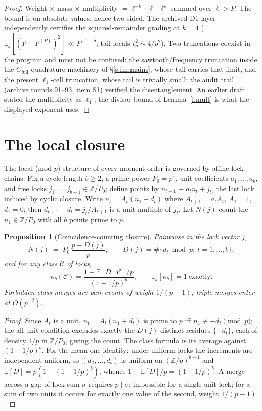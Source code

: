 \documentclass[11pt]{article}
\numberwithin{equation}{section}
\newtheorem{proposition}[theorem]{Proposition}
\theoremstyle{definition}
\theoremstyle{remark}
\begin{document}
\begin{proof}
Weight $\times$ mass $\times$ multiplicity
$=\ell^{-k}\cdot\ell\cdot\ell^{\varepsilon}$ summed over
$\ell>P$. The bound is on absolute values, hence two-sided. The
archived D1 layer independently certifies the squared-remainder
grading at $k=4$ ($\mathbb E_j[(F-F^{(P)})^2]\ll P^{-1-\delta}$;
tail locals $t_p^{2}\sim4/p^{2}$). Two truncations coexist in the
program and must not be confused: the sawtooth/frequency
truncation inside the $C_{\mathrm{full}}$-quadrature machinery of
\S\ref{s:fm:mains}, whose tail carries that limit, and the
present $\ell_1$-cell truncation, whose tail is trivially small;
the audit trail (archive rounds 91--93, item S1) verified the
disentanglement. An earlier draft stated the multiplicity as
$\ell_1$; the divisor bound of Lemma~\ref{l:mult} is what the
displayed exponent uses.
\end{proof}

\section{The local closure}\label{s:local}

The local (mod $p$) structure of every moment order is governed
by affine lock chains. Fix a cycle length $b\ge2$, a prime power
$P_0=p^{s}$, unit coefficients $a_1,\dots,a_b$, and free locks
$j_1,\dots,j_{b-1}\in\mathbb Z/P_0$; define points by
$n_{t+1}\equiv a_tn_t+j_t$, the last lock induced by cyclic
closure. Write $n_t=A_t(n_1+d_t)$ where $A_{t+1}=a_tA_t$,
$A_1=1$, $d_1=0$; then $d_{t+1}-d_t=j_t/A_{t+1}$ is a unit
multiple of $j_t$. Let $N(j)$ count the $n_1\in\mathbb Z/P_0$
with all $b$ points prime to $p$.

\begin{proposition}[Coincidence-counting closure]\label{p:local}
Pointwise in the lock vector $j$,
\[
N(j)\;=\;P_0\,\frac{p-D(j)}{p},
\qquad
D(j)=\#\{d_t\bmod p:\ t=1,\dots,b\},
\]
and for any class $\mathcal C$ of locks,
\[
\kappa_b(\mathcal C)
=\frac{1-\mathbb E[D\mid\mathcal C]/p}{(1-1/p)^{b}},
\qquad
\mathbb E_j[\kappa_b]=1\ \text{exactly.}
\]
Forbidden-class merges are pair events of weight $1/(p-1)$;
triple merges enter at $O(p^{-2})$.
\end{proposition}

\begin{proof}
Since $A_t$ is a unit, $n_t=A_t(n_1+d_t)$ is prime to $p$ iff
$n_1\not\equiv-d_t\pmod p$; the all-unit condition excludes
exactly the $D(j)$ distinct residues $\{-d_t\}$, each of density
$1/p$ in $\mathbb Z/P_0$, giving the count. The class formula is
its average against $(1-1/p)^{b}$. For the mean-one identity:
under uniform locks the increments are independent uniform, so
$(d_2,\dots,d_b)$ is uniform on $(\mathbb Z/p)^{b-1}$ and
$\mathbb E[D]=p(1-(1-1/p)^{b})$, whence
$1-\mathbb E[D]/p=(1-1/p)^{b}$. A merge across a gap of lock-sum
$\sigma$ requires $p\mid\sigma$: impossible for a single unit
lock; for a sum of two units it occurs for exactly one value of
the second, weight $1/(p-1)$.
\end{proof}
\end{document}
